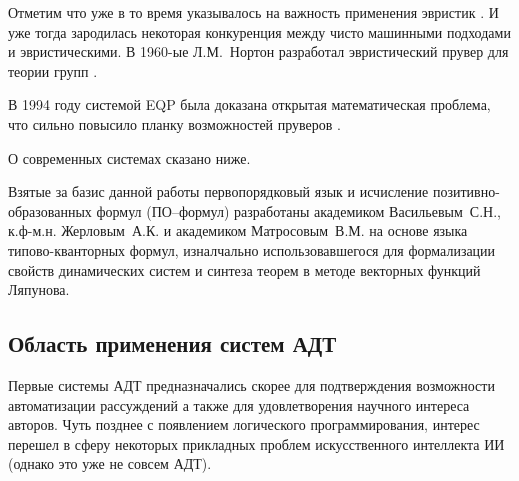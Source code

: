 Отметим что уже в то время указывалось на важность применения эвристик \cite{LogicComp}. И уже тогда зародилась некоторая конкуренция между чисто машинными подходами и эвристическими. В 1960-ые Л.М.~Нортон разработал эвристический прувер для теории групп \cite{LogicComp}.

В 1994 году системой EQP была доказана открытая математическая проблема, что сильно повысило планку возможностей пруверов \cite{McCuneRob}.

О современных системах сказано ниже.

Взятые за базис данной работы первопорядковый язык и исчисление позитивно-образованных формул (ПО--формул) разработаны академиком Васильевым~С.Н., к.ф-м.н. Жерловым~А.К. и академиком Матросовым~В.М. на основе языка типово-кванторных формул, изналчально использовавшегося для формализации свойств динамических систем и синтеза теорем в методе векторных функций Ляпунова.





\subsection{Область применения систем АДТ}
Первые системы АДТ предназначались скорее для подтверждения возможности автоматизации рассуждений а также для удовлетворения научного интереса авторов. Чуть позднее с появлением логического программирования, интерес перешел в сферу некоторых прикладных проблем искусственного интеллекта ИИ (однако это уже не совсем АДТ).

